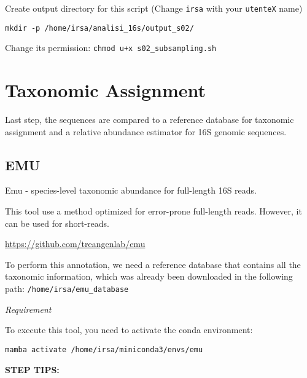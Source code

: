 \documentclass[
]{book}
\begin{document}
Create output directory for this script (Change \texttt{irsa} with your \texttt{utenteX} name)

\begin{verbatim}
mkdir -p /home/irsa/analisi_16s/output_s02/
\end{verbatim}

Change its permission:
\texttt{chmod\ u+x\ s02\_subsampling.sh}

\section{Taxonomic Assignment}\label{taxonomic-assignment}

Last step, the sequences are compared to a reference database for taxonomic assignment and a relative abundance estimator for 16S genomic sequences.

\subsection{EMU}\label{emu}

Emu - species-level taxonomic abundance for full-length 16S reads.

This tool use a method optimized for error-prone full-length reads. However, it can be used for short-reads.

\url{https://github.com/treangenlab/emu}

To perform this annotation, we need a reference database that contains all the taxonomic information, which was already been downloaded in the following path: \texttt{/home/irsa/emu\_database}

\emph{Requirement}

To execute this tool, you need to activate the conda environment:

\texttt{mamba\ activate\ /home/irsa/miniconda3/envs/emu}

\textbf{STEP TIPS:}
\end{document}
